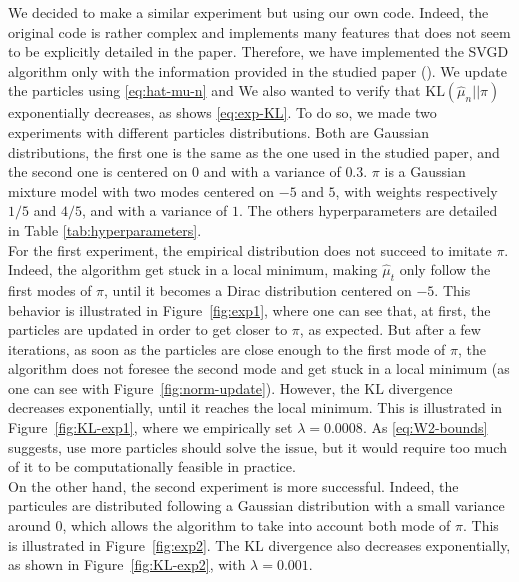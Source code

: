 \documentclass{article}
\newcommand{\KL}{\mathrm{KL}}
\begin{document}
We decided to make a similar experiment but using our own code.
Indeed, the original code is rather complex and implements
many features that does not seem to be explicitly detailed in the paper.
Therefore, we have implemented the SVGD algorithm only with the information
provided in the studied paper (\cite{main-paper}).
We update the particles using \eqref{eq:hat-mu-n} and
We also wanted to verify that $\KL(\hat{\mu}_n || \pi)$ exponentially
decreases, as shows \eqref{eq:exp-KL}.
To do so, we made two experiments with different particles
distributions. Both are Gaussian distributions, the first one
is the same as the one used in the studied paper, and the second one
is centered on $0$ and with a variance of $0.3$.
$\pi$ is a Gaussian mixture model with two modes centered on $-5$ and $5$,
with weights respectively $1/5$ and $4/5$, and with a variance of $1$.
The others hyperparameters are detailed in Table \ref{tab:hyperparameters}.\\

For the first experiment,
the empirical distribution does not succeed to imitate $\pi$.
Indeed, the algorithm get stuck in a local minimum, making $\hat{\mu}_t$
only follow the first modes of $\pi$, until it becomes a Dirac distribution
centered on $-5$.
This behavior is illustrated in Figure~\ref{fig:exp1}, where
one can see that, at first, the particles are updated in order
to get closer to $\pi$, as expected. But after a few iterations,
as soon as the particles are close enough to the first mode of $\pi$,
the algorithm does not foresee the second mode and get stuck in a local minimum
(as one can see with Figure~\ref{fig:norm-update}).
However, the $\KL$ divergence decreases exponentially, until it reaches
the local minimum. This is illustrated in Figure~\ref{fig:KL-exp1},
where we empirically set $\lambda = 0.0008$.
As \eqref{eq:W2-bounds} suggests, use more particles
should solve the issue, but it would require too much of it to be
computationally feasible in practice.\\

On the other hand, the second experiment is more successful.
Indeed, the particules are distributed following a Gaussian distribution
with a small variance around $0$, which allows the algorithm
to take into account both mode of $\pi$. This is illustrated in
Figure~\ref{fig:exp2}. The $\KL$ divergence also decreases exponentially,
as shown in Figure~\ref{fig:KL-exp2}, with $\lambda = 0.001$.
\end{document}
